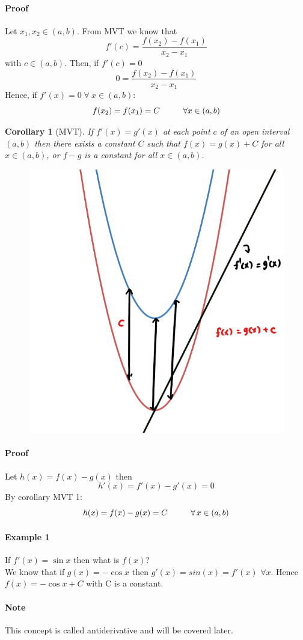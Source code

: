 \documentclass[12pt]{article}
\newcommand\tab[1][1cm]{\hspace*{#1}}
\newtheorem{corollary}{Corollary}
\begin{document}
\paragraph{Proof}
Let $x_1, x_2 \in (a,b)$. From MVT we know that 
\[
    f'(c) = \frac{f(x_2) - f(x_1)}{x_2 - x_1} 
\]
with $c \in (a,b)$. Then, if $f'(c) = 0$
\[
    0 = \frac{f(x_2) - f(x_1)}{x_2 - x_1} 
\]
Hence, if $f'(x) = 0 \; \forall \: x \in (a,b)$:
\[
    f(x_2) = f(x_1) = C \textrm{\tab} \forall x \in (a, b)
\]

\begin{corollary}[MVT] 
     If $f'(x) = g'(x)$ at each point $c$ of an open interval $(a,b)$ then there exists
     a constant $C$ such that $f(x) = g(x) + C$ for all $x \in (a,b) $, or $f - g$ is a constant 
     for all $x \in (a,b)$. 
\end{corollary}

\begin{figure}[h!]
     \centering
     \includegraphics[width = 0.35\linewidth]{Images/corollary 2.png}
\end{figure}
\paragraph{Proof}
Let $h(x) = f(x) - g(x)$ then
\[
    h'(x) = f'(x) - g'(x) = 0
\]
\noindent
By corollary MVT 1:
\[
    h(x) = f(x) - g(x) = C \textrm{\tab} \forall \, x \in (a,b)
\]

\paragraph{Example 1} If $f'(x) = \sin x$ then what is $f(x)$? \\

We know that if $g(x) = - \cos x$ then $g'(x) = sin (x) = f'(x)$ $\forall x$.
Hence $f(x) = - \cos x + C$ with C is a constant. 

\paragraph{Note} This concept is called antiderivative and will be covered later.
\end{document}
